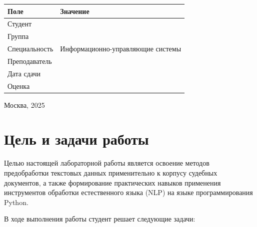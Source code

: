 \documentclass[12pt, a4paper]{report}
\begin{document}
\begin{titlepage}
\begin{flushright}
  \begin{tabular}{p{5cm}p{7cm}}
    \toprule
    \rowcolor{LightBlue}
    \sffamily\small\bfseries Поле & \sffamily\small\bfseries Значение \\
    \midrule
    \sffamily\small Студент       & \underline{\hspace{6.5cm}} \\[4pt]
    \sffamily\small Группа        & \underline{\hspace{6.5cm}} \\[4pt]
    \sffamily\small Специальность & Информационно-управляющие системы \\[4pt]
    \sffamily\small Преподаватель & \underline{\hspace{6.5cm}} \\[4pt]
    \sffamily\small Дата сдачи    & \underline{\hspace{6.5cm}} \\[4pt]
    \sffamily\small Оценка        & \underline{\hspace{6.5cm}} \\
    \bottomrule
  \end{tabular}
\end{flushright}

\vfill
\begin{center}
  {\sffamily\normalsize Москва, 2025}
\end{center}
\end{titlepage}

\tableofcontents
\thispagestyle{plain}
\clearpage

\chapter{Цель и задачи работы}

Целью настоящей лабораторной работы является освоение методов предобработки
текстовых данных применительно к корпусу судебных документов, а также формирование
практических навыков применения инструментов обработки естественного языка (NLP)
на языке программирования Python.

В ходе выполнения работы студент решает следующие задачи:
\end{document}
